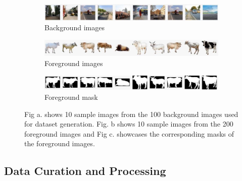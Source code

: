 \documentclass{article}
\begin{document}
\begin{figure}
  \begin{subfigure}{13cm}
    \centering\includegraphics[width=10cm]{bgimages.jpg}
    \caption{Background images}
  \end{subfigure}
  \begin{subfigure}{13cm}
    \centering\includegraphics[width=10cm]{fgimages.jpg}
    \caption{Foreground images}
  \end{subfigure}
 
  \begin{subfigure}{13cm}
    \centering\includegraphics[width=10cm]{fgmask.jpg}
    \caption{Foreground mask}
  \end{subfigure}
  
  \caption{Fig a. shows 10 sample images from the 100 background images used for dataset generation. Fig. b shows 10 sample images from the 200 foreground images and Fig c. showcases the corresponding masks of the foreground images.}
  \label{fig:sourcedata}
\end{figure}




\subsection{Data Curation and Processing}
\end{document}
